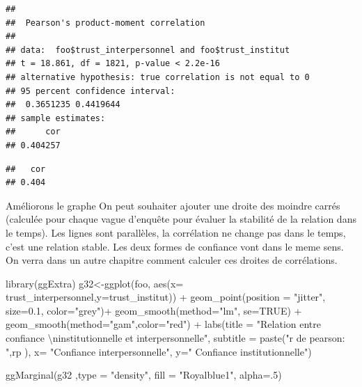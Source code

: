 \documentclass[
]{book}
\newenvironment{Shaded}{\begin{snugshade}}{\end{snugshade}}
\newcommand{\AttributeTok}[1]{\textcolor[rgb]{0.77,0.63,0.00}{#1}}
\newcommand{\ConstantTok}[1]{\textcolor[rgb]{0.00,0.00,0.00}{#1}}
\newcommand{\DecValTok}[1]{\textcolor[rgb]{0.00,0.00,0.81}{#1}}
\newcommand{\FloatTok}[1]{\textcolor[rgb]{0.00,0.00,0.81}{#1}}
\newcommand{\FunctionTok}[1]{\textcolor[rgb]{0.00,0.00,0.00}{#1}}
\newcommand{\NormalTok}[1]{#1}
\newcommand{\OtherTok}[1]{\textcolor[rgb]{0.56,0.35,0.01}{#1}}
\newcommand{\SpecialCharTok}[1]{\textcolor[rgb]{0.00,0.00,0.00}{#1}}
\newcommand{\StringTok}[1]{\textcolor[rgb]{0.31,0.60,0.02}{#1}}
\begin{document}
\begin{verbatim}
## 
##  Pearson's product-moment correlation
## 
## data:  foo$trust_interpersonnel and foo$trust_institut
## t = 18.861, df = 1821, p-value < 2.2e-16
## alternative hypothesis: true correlation is not equal to 0
## 95 percent confidence interval:
##  0.3651235 0.4419644
## sample estimates:
##      cor 
## 0.404257
\end{verbatim}

\begin{Shaded}
\end{Shaded}

\begin{verbatim}
##   cor 
## 0.404
\end{verbatim}

Améliorons le graphe On peut souhaiter ajouter une droite des moindre carrés (calculée pour chaque vague d'enquête pour évaluer la stabilité de la relation dans le temps). Les lignes sont parallèles, la corrélation ne change pas dans le temps, c'est une relation stable. Les deux formes de confiance vont dans le meme sens. On verra dans un autre chapitre comment calculer ces droites de corrélations.

\begin{Shaded}
\begin{Highlighting}[]
\FunctionTok{library}\NormalTok{(ggExtra)}
\NormalTok{g32}\OtherTok{\textless{}{-}}\FunctionTok{ggplot}\NormalTok{(foo, }\FunctionTok{aes}\NormalTok{(}\AttributeTok{x=}\NormalTok{ trust\_interpersonnel,}\AttributeTok{y=}\NormalTok{trust\_institut)) }\SpecialCharTok{+}
  \FunctionTok{geom\_point}\NormalTok{(}\AttributeTok{position =} \StringTok{"jitter"}\NormalTok{, }\AttributeTok{size=}\FloatTok{0.1}\NormalTok{, }\AttributeTok{color=}\StringTok{"grey"}\NormalTok{)}\SpecialCharTok{+}
  \FunctionTok{geom\_smooth}\NormalTok{(}\AttributeTok{method=}\StringTok{"lm"}\NormalTok{, }\AttributeTok{se=}\ConstantTok{TRUE}\NormalTok{) }\SpecialCharTok{+}
  \FunctionTok{geom\_smooth}\NormalTok{(}\AttributeTok{method=}\StringTok{"gam"}\NormalTok{,}\AttributeTok{color=}\StringTok{"red"}\NormalTok{)     }\SpecialCharTok{+}
  \FunctionTok{labs}\NormalTok{(}\AttributeTok{title =} \StringTok{"Relation entre confiance }\SpecialCharTok{\textbackslash{}n}\StringTok{institutionnelle et interpersonnelle"}\NormalTok{, }
       \AttributeTok{subtitle =} \FunctionTok{paste}\NormalTok{(}\StringTok{"r de pearson: "}\NormalTok{,rp ),}
       \AttributeTok{x=} \StringTok{"Confiance interpersonnelle"}\NormalTok{,}
       \AttributeTok{y=}\StringTok{" Confiance institutionnelle"}\NormalTok{)}

\FunctionTok{ggMarginal}\NormalTok{(g32  ,}\AttributeTok{type =} \StringTok{"density"}\NormalTok{, }\AttributeTok{fill =} \StringTok{"Royalblue1"}\NormalTok{, }\AttributeTok{alpha=}\NormalTok{.}\DecValTok{5}\NormalTok{)}
\end{Highlighting}
\end{Shaded}
\end{document}
